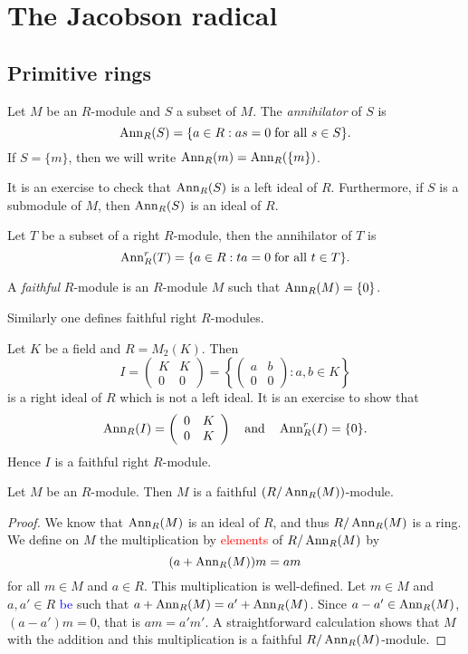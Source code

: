 \chapter{The Jacobson radical}
\label{radical}

\section{Primitive rings}

Let $M$ be an $R$-module and $S$ a subset of $M$. The \emph{annihilator} of $S$ is
\[
\operatorname{Ann}_R(S)=\{ a\in R:as=0\;\text{for all } s\in S\} .
\]
If $S=\{m\}$, then we will write $\operatorname{Ann}_R(m)=\operatorname{Ann}_R(\{m\})$.

It is an exercise to check that $\operatorname{Ann}_R(S)$ is a left ideal of $R$. Furthermore,
if $S$ is a submodule of $M$, then $\operatorname{Ann}_R(S)$ is an ideal of $R$.

Let $T$ be a subset of a right $R$-module, then the annihilator of $T$ is
\[
\operatorname{Ann}^r_R(T)=\{ a\in R: ta=0\;\text{for all }t\in T\} .
\]

\begin{definition}
    A \emph{faithful} $R$-module is an $R$-module $M$ such that $\operatorname{Ann}_R(M)=\{0\}$. 
\end{definition}

Similarly one defines faithful right $R$-modules.

\begin{example}
Let $K$ be a field and $R=M_2(K)$. Then
\[
I=\left(\begin{array}{cc} K&K\\
0&0\end{array}\right) =\left\{\left(\begin{array}{cc} a&b\\
0&0\end{array} \right): a,b\in K\right\} 
\]
is a right ideal of $R$ which is not a left ideal.
It is an exercise to show that 
\[
\operatorname{Ann}_R(I)=\left(\begin{array}{cc} 0&K\\
0&K\end{array}\right)\quad\mbox{and}\quad \operatorname{Ann}^r_R(I)=\{0\}.
\]
Hence $I$ is a faithful right $R$-module.
\end{example}

\begin{lemma}\label{Lema 1.1.1}
Let $M$ be an $R$-module. Then $M$ is a faithful
$(R/\operatorname{Ann}_R(M))$-module.
\end{lemma}

\begin{proof}
We know that $\operatorname{Ann}_R(M)$ is an ideal of $R$, and thus $R/\operatorname{Ann}_R(M)$ is a ring. 
We define on $M$ the multiplication by \textcolor{red}{elements} of $R/\operatorname{Ann}_R(M)$ by
\[
(a+\operatorname{Ann}_R(M))m=am
\]
for all $m\in M$ and $a\in R$. This multiplication is well-defined.
Let $m\in M$ and $a,a'\in R$ \textcolor{blue}{be} such that $a+\operatorname{Ann}_R(M)=a'+\operatorname{Ann}_R(M)$.
Since $a-a'\in \operatorname{Ann}_R(M)$, 
$(a-a')m=0$, that is $am=a'm'$. 
A straightforward calculation shows that $M$ 
with the addition and this multiplication is a faithful $R/\operatorname{Ann}_R(M)$-module.
\end{proof}

